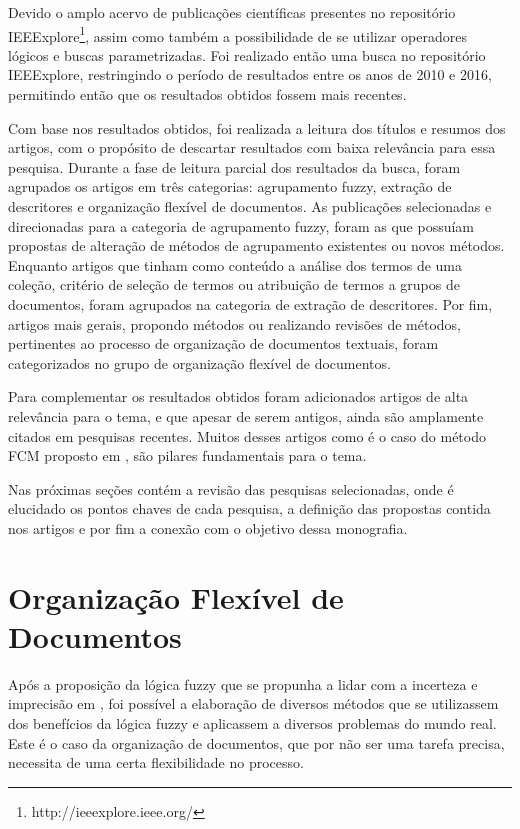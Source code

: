 Devido o amplo acervo de publicações científicas presentes no repositório
IEEExplore\footnote{http://ieeexplore.ieee.org/}, assim como também a possibilidade de se utilizar
operadores lógicos e buscas parametrizadas. Foi realizado então uma busca no repositório IEEExplore,
restringindo o período de resultados entre os anos de 2010 e 2016, permitindo então que os
resultados obtidos fossem mais recentes.

Com base nos resultados obtidos, foi realizada a leitura dos títulos e resumos dos artigos, com o
propósito de descartar resultados com baixa relevância para essa pesquisa.  Durante a fase de
leitura parcial dos resultados da busca, foram agrupados os artigos em três categorias: agrupamento
fuzzy, extração de descritores e organização flexível de documentos.  As publicações selecionadas e
direcionadas para a categoria de agrupamento fuzzy, foram as que possuíam propostas de alteração de
métodos de agrupamento existentes ou novos métodos. Enquanto artigos que tinham como conteúdo a
análise dos termos de uma coleção, critério de seleção de termos ou atribuição de termos a grupos de
documentos, foram agrupados na categoria de extração de descritores. Por fim, artigos mais gerais,
propondo métodos ou realizando revisões de métodos, pertinentes ao processo de organização de
documentos textuais, foram categorizados no grupo de organização flexível de documentos.

Para complementar os resultados obtidos foram adicionados artigos de alta relevância para o tema, e
que apesar de serem antigos, ainda são amplamente citados em pesquisas recentes. Muitos desses
artigos como é o caso do método FCM proposto em \cite{Bezdek1984}, são pilares fundamentais para o
tema.

Nas próximas seções contém a revisão das pesquisas selecionadas, onde é elucidado os pontos chaves
de cada pesquisa, a definição das propostas contida nos artigos e por fim a conexão com o objetivo
dessa monografia.

\section{Organização Flexível de Documentos}

Após a proposição da lógica fuzzy que se propunha a lidar com a incerteza e imprecisão em
\cite{Zadeh1965}, foi possível a elaboração de diversos métodos que se utilizassem dos benefícios da
lógica fuzzy e aplicassem a diversos problemas do mundo real. Este é o caso da organização de
documentos, que por não ser uma tarefa precisa, necessita de uma certa flexibilidade no processo.


